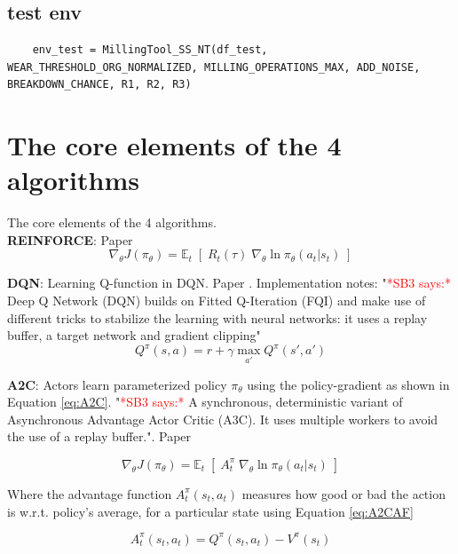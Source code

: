 \documentclass[a4paper, 12pt]{article}
\begin{document}
\subsection{test env}
\begin{verbatim}
	env_test = MillingTool_SS_NT(df_test, WEAR_THRESHOLD_ORG_NORMALIZED, MILLING_OPERATIONS_MAX, ADD_NOISE, BREAKDOWN_CHANCE, R1, R2, R3)
\end{verbatim}

\section{The core elements of the 4 algorithms}
The core elements of the 4 algorithms. \citep{graesser2019} \\

\textbf{REINFORCE}: Paper \citep{REINFORCE-williams1992}
\begin{equation}
	\nabla_ \theta J(\pi_\theta) = \mathbb{E}_t \; [ \; R_t(\tau) \; \nabla_\theta \ln \pi_\theta(a_t \vert s_t) \;]
	\label{eq:REINFORCE}
\end{equation}

\textbf{DQN}:
Learning Q-function in DQN. Paper \citep{DQN-mnih2013}. Implementation notes: "\textcolor{red}{*SB3 says:*} Deep Q Network (DQN) builds on Fitted Q-Iteration (FQI) and make use of different tricks to stabilize the learning with neural networks: it uses a replay buffer, a target network and gradient clipping" 
\begin{equation}
	Q^\pi (s, a) = r + \gamma  \max_{a'} Q^\pi (s', a')
	\label{eq:DQN}
\end{equation}

\textbf{A2C}: Actors learn parameterized policy $\pi_{\theta}$ using the policy-gradient as shown in Equation \ref{eq:A2C}. "\textcolor{red}{*SB3 says:*} A synchronous, deterministic variant of Asynchronous Advantage Actor Critic (A3C). It uses multiple workers to avoid the use of a replay buffer.". Paper \citep{A2C-mnih2016} 

\begin{equation}
	\nabla_ \theta J(\pi_\theta) = \mathbb{E}_t \; [ \; A^\pi_t \; \nabla_\theta \ln \pi_\theta(a_t \vert s_t) \;]
	\label{eq:A2C}
\end{equation}

Where the advantage function $A^\pi_t (s_t, a_t)$ measures how good or bad the action is w.r.t. policy's average, for a particular state using Equation \ref{eq:A2CAF}

\begin{equation}
	A^\pi_t (s_t, a_t) = Q^\pi (s_t, a_t) - V^\pi (s_t)
	\label{eq:A2CAF}
\end{equation}
\end{document}
